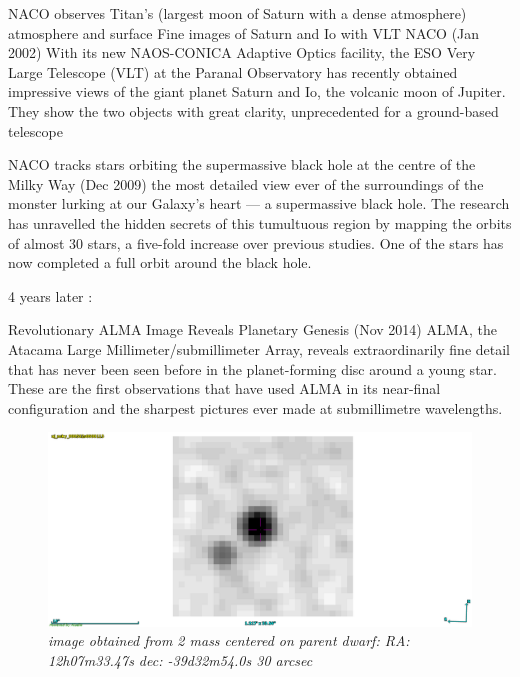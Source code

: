 \documentclass[12pt,a4paper]{article}  %
\begin{document}
NACO observes Titan's (largest moon of Saturn with a dense atmosphere) atmosphere and surface
Fine images of Saturn and Io with VLT NACO  (Jan 2002)
With its new NAOS-CONICA Adaptive Optics facility, the ESO Very Large Telescope (VLT) at the Paranal Observatory has recently obtained impressive views of the giant planet Saturn and Io, the volcanic moon of Jupiter. They show the two objects with great clarity, unprecedented for a ground-based telescope



NACO tracks stars orbiting the supermassive black hole at the centre of the Milky Way  (Dec 2009)
the most detailed view ever of the surroundings of the monster lurking at our Galaxy's heart — a supermassive black hole. The research has unravelled the hidden secrets of this tumultuous region by mapping the orbits of almost 30 stars, a five-fold increase over previous studies. One of the stars has now completed a full orbit around the black hole.



4 years later :

Revolutionary ALMA Image Reveals Planetary Genesis (Nov 2014)
ALMA, the Atacama Large Millimeter/submillimeter Array, reveals extraordinarily fine detail that has never been seen before in the planet-forming disc around a young star. These are the first observations that have used ALMA in its near-final configuration and the sharpest pictures ever made at submillimetre wavelengths. 


\begin{figure}[tbh]
\includegraphics[scale=0.4]{2mass.png}
\caption{\em{image obtained from 2 mass centered on parent dwarf:  RA: 12h07m33.47s dec: -39d32m54.0s  30 arcsec}}
\end{figure}
\end{document}
